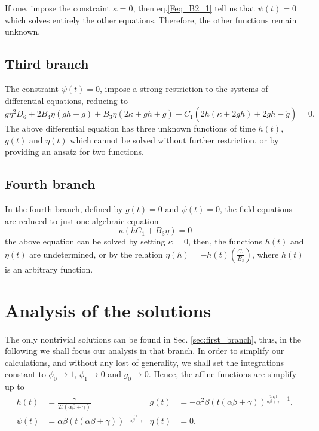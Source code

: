 \documentclass{article}
\begin{document}
If one, impose the constraint $\kappa = 0$, then eq.\eqref{Feq_B2_1} tell us that $\psi(t) = 0$ which solves entirely the other
equations. Therefore, the other functions remain unknown.

\subsection{Third branch}

The constraint $\psi(t)=0$, impose a strong restriction to the systems of differential equations, reducing to 
\begin{equation}
    g\eta^2D_6 + 2B_4\eta \left(gh - \dot{g}\right) + B_3\eta\left(2\kappa + gh + \dot{g}\right) + 
    C_1\left(2h\left(\kappa + 2gh\right) + 2g\dot{h} - \ddot{g}\right) = 0.
\end{equation}
The above differential equation has three unknown functions of time $h(t)$, $g(t)$ and $\eta(t)$ which cannot be solved without 
further restriction, or by providing an ansatz for two functions.

\subsection{Fourth branch}

In the fourth branch, defined by $g(t) = 0$ and $\psi (t) = 0$, the field equations are reduced
to just one algebraic equation
\begin{equation}
    \kappa\left(hC_1 + B_3\eta\right) = 0
\end{equation}
the above equation can be solved by setting $\kappa = 0$, then, the functions $h(t)$ and $\eta(t)$ are undetermined,
or by the relation $\eta(h) = - h(t)\left(\frac{C_1}{B_3}\right)$, where $h(t)$ is an arbitrary function.

\section{Analysis of the solutions}
\label{sec:analysis}

The only nontrivial solutions can be found in Sec. \ref{sec:first_branch}, thus, in the following we shall
focus our analysis in that branch. In order to simplify our calculations, and without any lost of generality, we shall
set the integrations constant to $\phi_0 \to 1$, $\phi_1 \to 0$ and $g_0 \to 0$. Hence, the affine functions 
are simplify up to
\begin{align}
    h(t) & = \frac{\gamma}{2t\left(\alpha\beta + \gamma\right)} & 
    g(t) & = -\alpha^2\beta \left(t\left(\alpha\beta + \gamma\right)\right)^{\frac{2\alpha\beta}{\alpha\beta + \gamma} -1}, \label{sol_hg}\\
    \psi(t) & = \alpha\beta\left(t\left(\alpha\beta + \gamma\right)\right)^{-\frac{\gamma}{\alpha\beta + \gamma}} & \eta(t) & = 0. \label{sol_pn}
\end{align}
\end{document}
